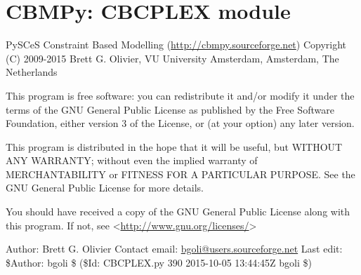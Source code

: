\documentclass[a4paper,11pt,english]{sphinxmanual}
\begin{document}
\section{CBMPy: CBCPLEX module}
\label{modules_doc:cbmpy-cbcplex-module}
PySCeS Constraint Based Modelling (\href{http://cbmpy.sourceforge.net}{http://cbmpy.sourceforge.net})
Copyright (C) 2009-2015 Brett G. Olivier, VU University Amsterdam, Amsterdam, The Netherlands

This program is free software: you can redistribute it and/or modify
it under the terms of the GNU General Public License as published by
the Free Software Foundation, either version 3 of the License, or
(at your option) any later version.

This program is distributed in the hope that it will be useful,
but WITHOUT ANY WARRANTY; without even the implied warranty of
MERCHANTABILITY or FITNESS FOR A PARTICULAR PURPOSE.  See the
GNU General Public License for more details.

You should have received a copy of the GNU General Public License
along with this program.  If not, see \textless{}\href{http://www.gnu.org/licenses/}{http://www.gnu.org/licenses/}\textgreater{}

Author: Brett G. Olivier
Contact email: \href{mailto:bgoli@users.sourceforge.net}{bgoli@users.sourceforge.net}
Last edit: \$Author: bgoli \$ (\$Id: CBCPLEX.py 390 2015-10-05 13:44:45Z bgoli \$)
\end{document}
